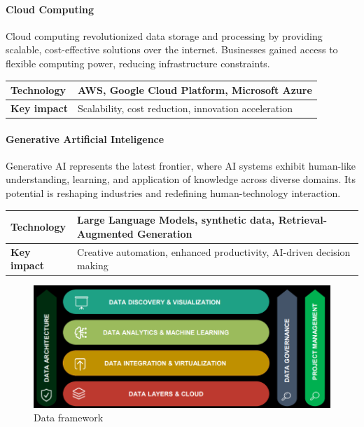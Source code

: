 \paragraph*{Cloud Computing}
Cloud computing revolutionized data storage and processing by providing scalable, cost-effective solutions over the internet. 
Businesses gained access to flexible computing power, reducing infrastructure constraints.
\renewcommand*{\arraystretch}{1.5}
\begin{table}[H]
    \centering
    \begin{tabular}{|l|l|}
    \hline
    \textbf{Technology} & AWS, Google Cloud Platform, Microsoft Azure                                 \\ \hline
    \textbf{Key impact} & Scalability, cost reduction, innovation acceleration \\ \hline
    \end{tabular}
\end{table}
\renewcommand*{\arraystretch}{1}

\paragraph*{Generative Artificial Inteligence}
Generative AI represents the latest frontier, where AI systems exhibit human-like understanding, learning, and application of knowledge across diverse domains.
Its potential is reshaping industries and redefining human-technology interaction.
\renewcommand*{\arraystretch}{1.5}
\begin{table}[H]
    \centering
    \begin{tabular}{|l|l|}
    \hline
    \textbf{Technology} & Large Language Models, synthetic data, Retrieval-Augmented Generation                                 \\ \hline
    \textbf{Key impact} & Creative automation, enhanced productivity, AI-driven decision making \\ \hline
    \end{tabular}
\end{table}
\renewcommand*{\arraystretch}{1}

\begin{figure}[H]
    \centering
    \includegraphics[width=0.5\linewidth]{images/bis3.png}
    \caption{Data framework}
\end{figure}


